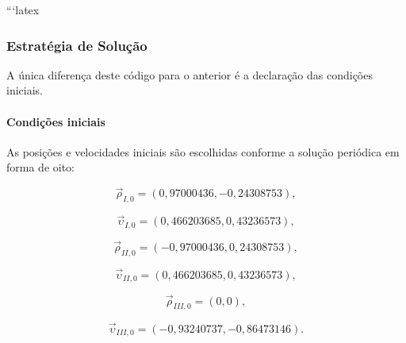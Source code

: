 \documentclass[12pt,a4paper]{article}
\begin{document}
```latex
\subsubsection{Estratégia de Solução}

A única diferença deste código para o anterior é a declaração das condições iniciais.

\paragraph{Condições iniciais}

As posições e velocidades iniciais são escolhidas conforme a solução periódica em forma de oito:

\begin{equation}
    \vec{\rho}_{I,0}=
    (0,97000436,-0,24308753),
\end{equation}

\begin{equation}
    \vec{\upsilon}_{I,0}=
    (0,466203685,0,43236573),
\end{equation}

\begin{equation}
    \vec{\rho}_{II,0}=
    (-0,97000436,0,24308753),
\end{equation}

\begin{equation}
    \vec{\upsilon}_{II,0}=
    (0,466203685,0,43236573),
\end{equation}

\begin{equation}
    \vec{\rho}_{III,0}=(0,0),
\end{equation}

\begin{equation}
    \vec{\upsilon}_{III,0}=
    (-0,93240737,-0,86473146).
\end{equation}
\end{document}
